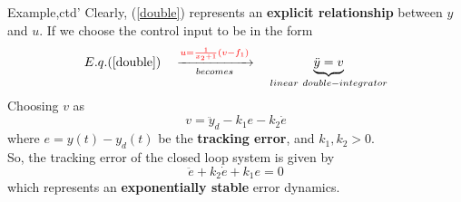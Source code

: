 \documentclass{beamer}
\begin{document}
\begin{frame}{Example,ctd'}
    Clearly, (\ref{double}) represents an \textbf{explicit relationship} between $y$ and $u$.  If we choose the control input to be in the form
    $$
        E.q.(\ref{double}) \quad \xrightarrow[becomes]{ {\color{red}u=\frac{1}{x_{2}+1}\left(v-f_{1}\right)}} \quad \underbrace{\ddot{y} = v}_{linear~double-integrator}
    $$
Choosing $v$ as
\begin{equation}\label{choose-v}
  v = \ddot{y}_{d}-k_{1}e-k_{2}\dot{e}
\end{equation}
where $e=y(t)-y_{d}(t)$ be the \textbf{tracking error}, and $k_{1}, k_{2} > 0$.\\
So, the tracking error of the closed loop system is given by
$$
\ddot{e}+k_{2} \dot{e}+k_{1} e=0
$$
which represents an \textbf{exponentially stable} error dynamics. 
\end{frame}
\end{document}
